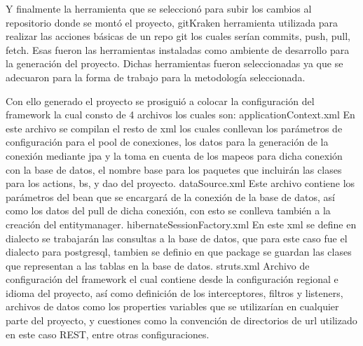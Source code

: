 Y finalmente la herramienta que se seleccionó para subir los cambios al repositorio donde se montó el proyecto, gitKraken herramienta utilizada para realizar las acciones básicas de un repo git los cuales serían commits, push, pull, fetch.
\newline \newline
Esas fueron las herramientas instaladas como ambiente de desarrollo para la generación del proyecto. Dichas herramientas fueron seleccionadas ya que se adecuaron para la forma de trabajo para la metodología seleccionada. 

Con ello generado el proyecto se prosiguió a colocar la configuración del framework la cual consto de 4 archivos los cuales son: 
\newline \newline
applicationContext.xml 
\newline \newline
En este archivo se compilan el resto de xml los cuales conllevan los parámetros de configuración para el pool de conexiones, los datos para la generación de la conexión mediante jpa y la toma en cuenta de los mapeos para dicha conexión con la base de datos, el nombre base para los paquetes que incluirán las clases para los actions, bs, y dao del proyecto.  
\newline \newline
dataSource.xml 
\newline \newline
Este archivo contiene los parámetros del bean que se encargará de la conexión de la base de datos, así como los datos del pull de dicha conexión, con esto se conlleva también a la creación del entitymanager. 
\newline \newline
hibernateSessionFactory.xml 
\newline \newline
En este xml se define en dialecto se trabajarán las consultas a la base de datos, que para este caso fue el dialecto para postgresql, tambien se definio en que package se guardan las clases que representan a las tablas en la base de datos. 
\newline \newline
 struts.xml 
\newline \newline
Archivo de configuración del framework el cual contiene desde la configuración regional e idioma del proyecto, así como definición de los interceptores, filtros y listeners, archivos de datos como los properties variables que se utilizarían en cualquier parte del proyecto, y cuestiones como la convención de directorios de url utilizado en este caso REST, entre otras configuraciones. 


